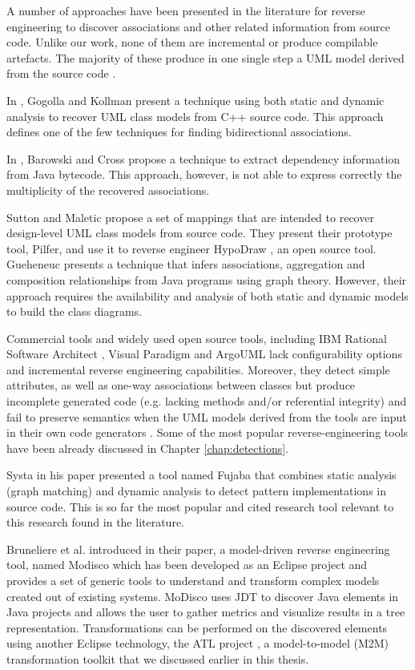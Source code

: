 A number of approaches have been presented in the literature for reverse engineering to discover associations and other related information from source code. Unlike our work, none of them are incremental or produce compilable artefacts. The majority of these produce in one single step a UML model derived from the source code \cite{Nelson1996}.

In \cite{Kollmann2001}, Gogolla and Kollman present a technique using both static and dynamic analysis to recover UML class models from C++ source code. This approach defines one of the few techniques for finding bidirectional associations.

In \cite{Barowski}, Barowski and Cross propose a technique to extract dependency information from Java bytecode. This approach, however, is not able to express correctly the multiplicity of the recovered associations.

Sutton and Maletic \cite{Sutton2007} propose a set of mappings that are intended to recover design-level UML class models from source code. They present their prototype tool, Pilfer, and use it to reverse engineer HypoDraw \cite{Hypodraw}, an open source tool.
Gueheneuc \cite{GueheneucSystematic} presents a technique that infers associations, aggregation and composition relationships from Java programs using graph theory. However, their approach requires the availability and analysis of both static and dynamic models to build the class diagrams.

Commercial tools and widely used open source tools, including IBM Rational Software Architect \cite{ROSE}, Visual Paradigm \cite{VisualParadigm} and ArgoUML \cite{ArgoUML} lack configurability options and incremental reverse engineering capabilities. Moreover, they detect simple attributes, as well as one-way associations between classes but produce incomplete generated code (e.g. lacking methods and/or referential integrity) and fail to preserve semantics when the UML models derived from the tools are input in their own code generators \cite{kollmanToolsCurrent}. Some of the most popular reverse-engineering tools have been already discussed in Chapter \ref{chap:detections}.

Systa in his paper \cite{Systa} presented a tool named Fujaba \cite{Systa} that combines static analysis (graph matching) and dynamic analysis to detect pattern implementations in source code. This is so far the most popular and cited research tool relevant to this research found in the literature.

Bruneliere et al. \cite{ModiscoMain} introduced in their paper, a model-driven reverse engineering tool, named Modisco which has been developed as an Eclipse project and provides a set of generic tools to understand and transform complex models created out of existing systems. MoDisco uses JDT \cite{jdtProject} to discover Java elements in Java projects and allows the user to gather metrics and visualize results in a tree representation. Transformations can be performed on the discovered elements using another Eclipse technology, the ATL project \cite{jdtProject}, a model-to-model (M2M) transformation toolkit that we discussed earlier in this thesis.

